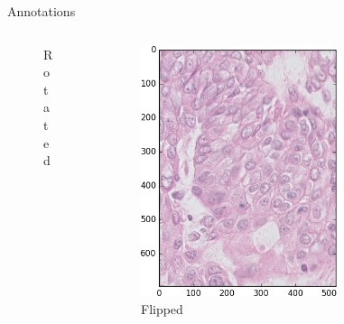 \documentclass{beamer}
\begin{document}
\begin{frame}{Annotations}
\begin{columns}[T]
\begin{column}{.16\textwidth}
\begin{figure}[!ht]
\caption{Rotated}
\label{fig:rot}
\end{figure}
\end{column}%
\begin{column}{.16\textwidth}
\begin{figure}[!ht]
\centering
\includegraphics[width=0.9\textwidth]{flip.png}\par 
\caption{Flipped}
\label{fig: flip}
\end{figure}
\end{column}
\begin{column}{.16\textwidth}
\begin{figure}[!ht]
\centering

\end{figure}
\end{column}
\end{columns}
\end{frame}
\end{document}
